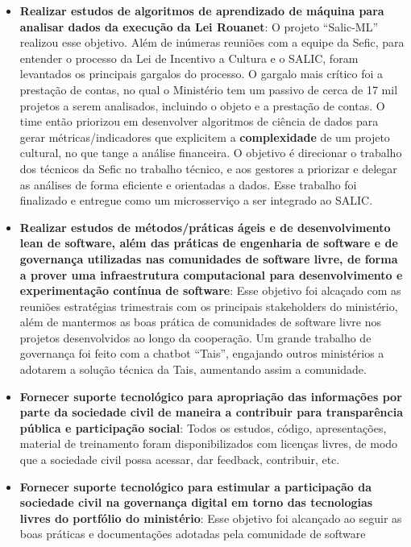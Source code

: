 \begin{itemize}
\item
  \textbf{Realizar estudos de algoritmos de aprendizado de máquina para
  analisar dados da execução da Lei Rouanet}: O projeto ``Salic-ML''
  realizou esse objetivo. Além de inúmeras reuniões com a equipe da
  Sefic, para entender o processo da Lei de Incentivo a Cultura e o
  SALIC, foram levantados os principais gargalos do processo. O gargalo
  mais crítico foi a prestação de contas, no qual o Ministério tem um
  passivo de cerca de 17 mil projetos a serem analisados, incluindo o
  objeto e a prestação de contas. O time então priorizou em desenvolver
  algoritmos de ciência de dados para gerar métricas/indicadores que
  explicitem a \textbf{complexidade} de um projeto cultural, no que
  tange a análise financeira. O objetivo é direcionar o trabalho dos
  técnicos da Sefic no trabalho técnico, e aos gestores a priorizar e
  delegar as análises de forma eficiente e orientadas a dados. Esse
  trabalho foi finalizado e entregue como um microsserviço a ser
  integrado ao SALIC.
\item
  \textbf{Realizar estudos de métodos/práticas ágeis e de
  desenvolvimento lean de software, além das práticas de engenharia de
  software e de governança utilizadas nas comunidades de software livre,
  de forma a prover uma infraestrutura computacional para
  desenvolvimento e experimentação contínua de software}: Esse objetivo
  foi alcaçado com as reuniões estratégias trimestrais com os principais
  stakeholders do ministério, além de mantermos as boas prática de
  comunidades de software livre nos projetos desenvolvidos ao longo da
  cooperação. Um grande trabalho de governança foi feito com a chatbot
  ``Tais'', engajando outros ministérios a adotarem a solução técnica da
  Tais, aumentando assim a comunidade.
\item
  \textbf{Fornecer suporte tecnológico para apropriação das informações
  por parte da sociedade civil de maneira a contribuir para
  transparência pública e participação social}: Todos os estudos,
  código, apresentações, material de treinamento foram disponibilizados
  com licenças livres, de modo que a sociedade civil possa acessar, dar
  feedback, contribuir, etc.
\item
  \textbf{Fornecer suporte tecnológico para estimular a participação da
  sociedade civil na governança digital em torno das tecnologias livres
  do portfólio do ministério}: Esse objetivo foi alcançado ao seguir as
  boas práticas e documentações adotadas pela comunidade de software

\end{itemize}
